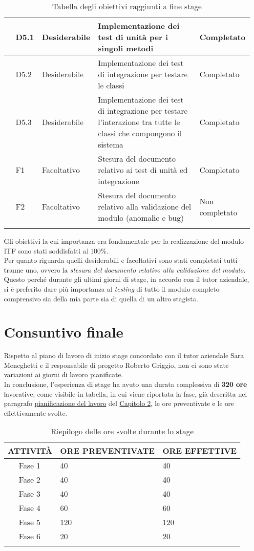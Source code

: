 \begin{longtable}{|r l|p{3cm}|p{8cm}|p{2cm}|}
	& D5.1 & Desiderabile & Implementazione dei test di unità per i singoli metodi & Completato\\\hline
	& D5.2 & Desiderabile & Implementazione dei test di integrazione per testare le classi & Completato\\\hline
	& D5.3 & Desiderabile & Implementazione dei test di integrazione per testare l'interazione tra tutte le classi che compongono il sistema & Completato\\\hline
	& F1 & Facoltativo & Stesura del documento relativo ai test di unità ed integrazione & Completato\\\hline	
	& F2 & Facoltativo & Stesura del documento relativo alla validazione del modulo (anomalie e bug) & Non completato\\\hline
	\caption{Tabella degli obiettivi raggiunti a fine stage}
\end{longtable}
Gli obiettivi la cui importanza era fondamentale per la realizzazione del modulo \gls{ITF} sono stati soddisfatti al 100\%.\\
Per quanto riguarda quelli desiderabili e facoltativi sono stati completati tutti tranne uno, ovvero la\textit{ stesura del documento relativo alla validazione del modulo}. Questo perché durante gli ultimi giorni di stage, in accordo con il tutor aziendale, si è preferito dare più importanza al \textit{testing} di tutto il modulo completo comprensivo sia della mia parte sia di quella di un altro stagista.
\section{Consuntivo finale}
Rispetto al piano di lavoro di inizio stage concordato con il tutor aziendale Sara Meneghetti e il responsabile di progetto Roberto Griggio, non ci sono state variazioni ai giorni di lavoro pianificate.\\
In conclusione, l'esperienza di stage ha avuto una durata complessiva di \textbf{320 ore} lavorative, come visibile in tabella, in cui viene riportata la fase, già descritta nel paragrafo \hyperref[sec:pianificazione_del_lavoro]{pianificazione del lavoro} del \hyperref[cap:tecnologie_e_strumenti]{Capitolo 2}, le ore preventivate e le ore effettivamente svolte. 
\begin{longtable}{|r l|p{5cm}|p{4cm}|}
	\hline
	\multicolumn{2}{|c|}{\textbf{ATTIVITÀ}} & \textbf{ORE PREVENTIVATE} & \textbf{ORE EFFETTIVE}\tabularnewline
	\hline
	& Fase 1 & \centerline{40} & \centerline{40} \\\hline	
	& Fase 2 & \centerline{40} & \centerline{40}\\\hline
	& Fase 3 & \centerline{40} & \centerline{40}\\\hline
	& Fase 4 & \centerline{60} & \centerline{60}\\\hline
	& Fase 5 & \centerline{120} & \centerline{120}\\\hline
	& Fase 6 & \centerline{20} & \centerline{20}\\\hline	
	\caption{Riepilogo delle ore svolte durante lo stage}
\end{longtable}
